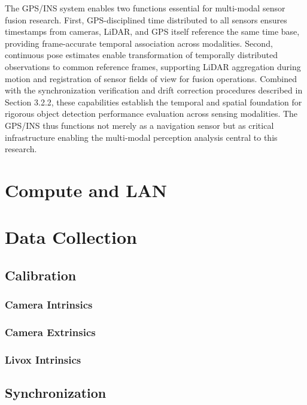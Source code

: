 \documentclass{erauthesis}
\begin{document}
The \ac{GPS}/\ac{INS} system enables two functions essential for multi-modal sensor fusion research.
First, \ac{GPS}-disciplined time distributed to all sensors ensures timestamps from cameras, \ac{LiDAR}, and \ac{GPS} itself reference the same time base, providing frame-accurate temporal association across modalities.
Second, continuous pose estimates enable transformation of temporally distributed observations to common reference frames, supporting \ac{LiDAR} aggregation during motion and registration of sensor fields of view for fusion operations.
Combined with the synchronization verification and drift correction procedures described in Section 3.2.2, these capabilities establish the temporal and spatial foundation for rigorous object detection performance evaluation across sensing modalities.
The \ac{GPS}/\ac{INS} thus functions not merely as a navigation sensor but as critical infrastructure enabling the multi-modal perception analysis central to this research.

    \section{Compute and LAN}
        
    \section{Data Collection}
    
        \subsection{Calibration}
        
            \subsubsection{Camera Intrinsics}
            
            \subsubsection{Camera Extrinsics}
            
            \subsubsection{Livox Intrinsics}
            
        \subsection{Synchronization}
        
\end{document}
